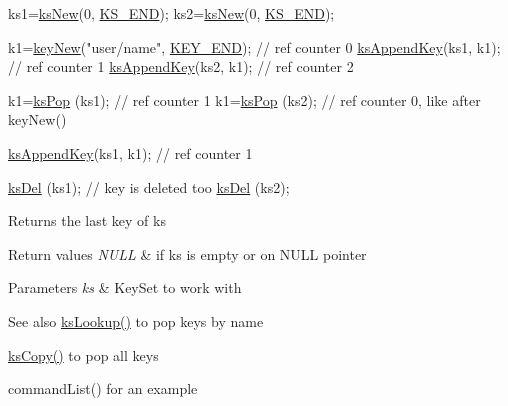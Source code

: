 \begin{DoxyCode}
ks1=\hyperlink{group__keyset_ga671e1aaee3ae9dc13b4834a4ddbd2c3c}{ksNew}(0, \hyperlink{kdbenum_8c_a7a28fce3773b2c873c94ac80b8b4cd54}{KS\_END});
ks2=\hyperlink{group__keyset_ga671e1aaee3ae9dc13b4834a4ddbd2c3c}{ksNew}(0, \hyperlink{kdbenum_8c_a7a28fce3773b2c873c94ac80b8b4cd54}{KS\_END});

k1=\hyperlink{group__key_gad23c65b44bf48d773759e1f9a4d43b89}{keyNew}(\textcolor{stringliteral}{"user/name"}, \hyperlink{group__key_gga91fb3178848bd682000958089abbaf40aa8adb6fcb92dec58fb19410eacfdd403}{KEY\_END}); \textcolor{comment}{// ref counter 0}
\hyperlink{group__keyset_gaa5a1d467a4d71041edce68ea7748ce45}{ksAppendKey}(ks1, k1); \textcolor{comment}{// ref counter 1}
\hyperlink{group__keyset_gaa5a1d467a4d71041edce68ea7748ce45}{ksAppendKey}(ks2, k1); \textcolor{comment}{// ref counter 2}

k1=\hyperlink{group__keyset_gae42530b04defb772059de0600159cf69}{ksPop} (ks1); \textcolor{comment}{// ref counter 1}
k1=\hyperlink{group__keyset_gae42530b04defb772059de0600159cf69}{ksPop} (ks2); \textcolor{comment}{// ref counter 0, like after keyNew()}

\hyperlink{group__keyset_gaa5a1d467a4d71041edce68ea7748ce45}{ksAppendKey}(ks1, k1); \textcolor{comment}{// ref counter 1}

\hyperlink{group__keyset_ga27e5c16473b02a422238c8d970db7ac8}{ksDel} (ks1); \textcolor{comment}{// key is deleted too}
\hyperlink{group__keyset_ga27e5c16473b02a422238c8d970db7ac8}{ksDel} (ks2);
\end{DoxyCode}


\begin{DoxyReturn}{Returns}
the last key of {\ttfamily ks} 
\end{DoxyReturn}

\begin{DoxyRetVals}{Return values}
{\em N\+U\+LL} & if {\ttfamily ks} is empty or on N\+U\+LL pointer \\
\hline
\end{DoxyRetVals}

\begin{DoxyParams}{Parameters}
{\em ks} & Key\+Set to work with \\
\hline
\end{DoxyParams}
\begin{DoxySeeAlso}{See also}
\hyperlink{group__keyset_gaa34fc43a081e6b01e4120daa6c112004}{ks\+Lookup()} to pop keys by name 

\hyperlink{group__keyset_gaba1f1dbea191f4d7e7eb3e4296ae7d5e}{ks\+Copy()} to pop all keys 

command\+List() for an example 
\end{DoxySeeAlso}
\mbox{\label{group__keyset_gabe793ff51f1728e3429c84a8a9086b70}} 
